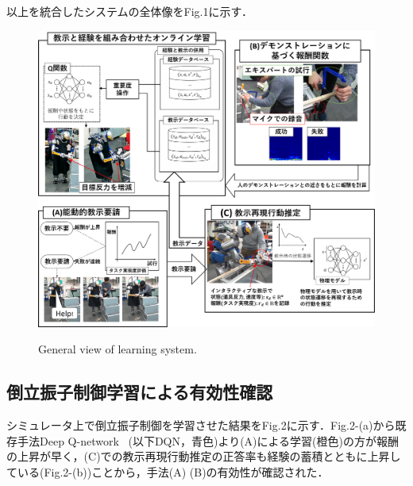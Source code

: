 \documentclass[twocolumn]{preport}
\begin{document}
以上を統合したシステムの全体像をFig.1に示す．
\begin{figure}[tbh]
  \begin{center}
    \begin{minipage}{1.0\columnwidth}
      \includegraphics[width=1.0\columnwidth]{finale.png}
      \caption{General view of learning system.}
    \end{minipage}
    \begin{minipage}{1.0\columnwidth}
    \end{minipage}
    \label{figure:cartpole}
  \end{center}
\end{figure}
\vspace*{-15pt}

\vspace*{-5pt}
\subsection{倒立振子制御学習による有効性確認}
シミュレータ上で倒立振子制御を学習させた結果をFig.2に示す．Fig.2-(a)から既存手法Deep Q-network~\cite{mnih2015human} (以下DQN，青色)より(A)による学習(橙色)の方が報酬の上昇が早く，(C)での教示再現行動推定の正答率も経験の蓄積とともに上昇している(Fig.2-(b))ことから，手法(A) (B)の有効性が確認された．
\vspace*{-20pt}
\end{document}
